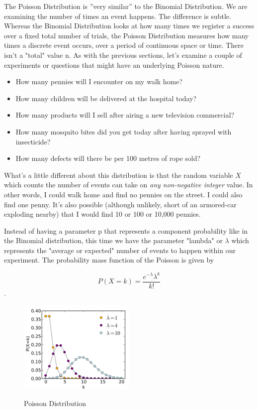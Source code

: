 The Poisson Distribution is ''very similar'' to the Binomial Distribution. We are examining the number of times an event happens. The difference is subtle. Whereas the Binomial Distribution looks at how many times we register a success over a fixed total number of trials, the Poisson Distribution measures how many times a discrete event occurs, over a period of continuous space or time. There isn't a "total" value n. As with the previous sections, let's examine a couple of experiments or questions that might have an underlying Poisson nature.

\begin{itemize}
  \item How many pennies will I encounter on my walk home?
  \item How many children will be delivered at the hospital today?
  \item How many products will I sell after airing a new television commercial?
  \item How many mosquito bites did you get today after having sprayed with insecticide?
  \item How many defects will there be per 100 metres of rope sold?
\end{itemize}

What's a little different about this distribution is that the random variable $X$ which counts the number of events can take on \emph{any non-negative integer} value. In other words, I could walk home and find no pennies on the street. I could also find one penny. It's also possible (although unlikely, short of an armored-car exploding nearby) that I would find 10 or 100 or 10,000 pennies.

Instead of having a parameter p that represents a component probability like in the Binomial distribution, this time we have the parameter "lambda" or $\lambda$ which represents the "average or expected" number of events to happen within our experiment. The probability mass function of the Poisson is given by

\begin{equation}
  P(X=k)=\frac{e^{-\lambda}\lambda^k}{k!}
\end{equation}.


\begin{figure}
  \centering
  \includegraphics[width=0.5\textwidth]{../Images/Poisson_pmf.png}\\
  \caption{Poisson Distribution}
\end{figure}

